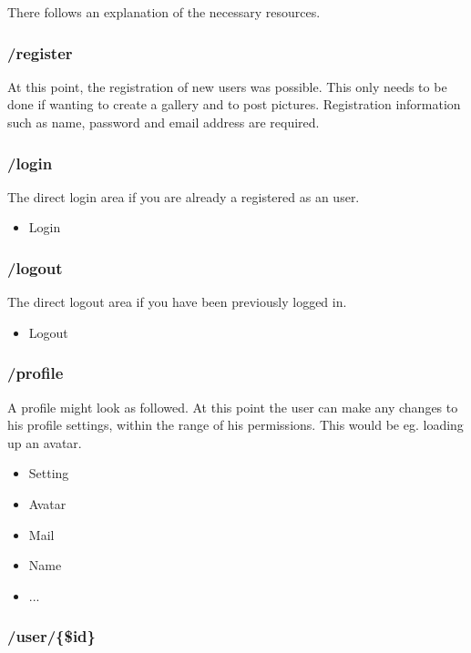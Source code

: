 \documentclass[a4paper,12pt,oneside]{article} %
\begin{document}
There follows an explanation of the necessary resources.


\subsubsection{/register}

At this point, the registration of new users was possible. This only
needs to be done if wanting to create a gallery and to post pictures.
Registration information such as name, password and email address
are required.


\subsubsection{/login}

The direct login area if you are already a registered as an user.
\begin{itemize}
\item Login
\end{itemize}

\subsubsection{/logout}

The direct logout area if you have been previously logged in.
\begin{itemize}
\item Logout
\end{itemize}

\subsubsection{/profile}

A profile might look as followed. At this point the user can make any
changes to his profile settings, within the range of his permissions.
This would be eg. loading up an avatar.
\begin{itemize}
\item Setting
\item Avatar
\item Mail
\item Name
\item ...
\end{itemize}

\subsubsection{/user/\{\$id\}}
\end{document}
